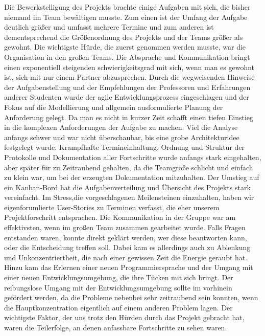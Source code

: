 \documentclass[
   draft=false
  ,paper=a4
  ,twoside=true
  ,fontsize=11pt
  ,headsepline
  ,DIV11
  ,parskip=full+
]{scrartcl} %
\begin{document}
Die Bewerkstelligung des Projekts brachte einige Aufgaben mit sich, die bisher niemand im Team bewältigen musste. Zum einen ist der Umfang der Aufgabe deutlich größer und umfasst mehrere Termine und zum anderen ist dementsprechend die Größenordnung des Projekts und der Teams größer als gewohnt.\newline
Die wichtigste Hürde, die zuerst genommen werden musste, war die Organisation in den großen Teams. Die Absprache und Kommunikation bringt einen exponentiell steigenden schwierigkeitsgrad mit sich, wenn man es gewohnt ist, sich mit nur einem Partner abzusprechen.
\newline
Durch die wegweisenden Hinweise der Aufgabenstellung und der Empfehlungen der Professoren und Erfahrungen anderer Studenten wurde der agile Entwicklungsprozess eingeschlagen und der Fokus auf die Modellierung und allgemein ausformulierte Planung der Anforderung gelegt. 
\newline
Da man es nicht in kurzer Zeit schafft einen tiefen Einstieg in die komplexen Anforderungen der Aufgabe zu machen. Viel die Analyse anfangs schwer und war nicht überschaubar, bis eine grobe Architekturidee festgelegt wurde. \newline Krampfhafte Termineinhaltung, Ordnung und Struktur der Protokolle und Dokumentation aller Fortschritte wurde anfangs stark eingehalten, aber später für zu Zeitraubend gehalten, da die Teamgröße schlicht und einfach zu klein war, um bei der erzeugten Dokumentation mitzuhalten. Der Umstieg auf ein Kanban-Bord hat die Aufgabenverteilung und Übersicht des Projekts stark vereinfacht.\newline
Im Stress,die vorgeschlagenen Meilensteinen einzuhalten, haben wir eigenforumlierte User-Stories zu Terminen verfasst, die eher unserem Projektforschritt entsprachen. 
\newline
Die Kommunikation in der Gruppe war am effektivsten, wenn im großen Team zusammen gearbeitet wurde. Falls Fragen entstanden waren, konnte direkt geklärt werden, wer diese beantworten kann, oder die Entscheidung treffen soll. Dabei kam es allerdings auch zu Ablenkung und Unkonzentriertheit, die nach einer gewissen Zeit die Energie geraubt hat. 
Hinzu kam das Erlernen einer neuen Programmiersprache und der Umgang mit einer neuen Entwicklungsumgebung, die ihre Tücken mit sich bringt. Der reibungslose Umgang mit der Entwicklungsumgebung sollte im vorhinein gefördert werden, da die Probleme nebenbei sehr zeitraubend sein konnten, wenn die Hauptkonzentration eigentlich auf einem anderen Problem lagen. 
Der wichtigste Faktor, der uns trotz den Hürden durch das Projekt gebracht hat, waren die Teilerfolge, an denen anfassbare Fortschritte zu sehen waren.
\newpage
\end{document}
